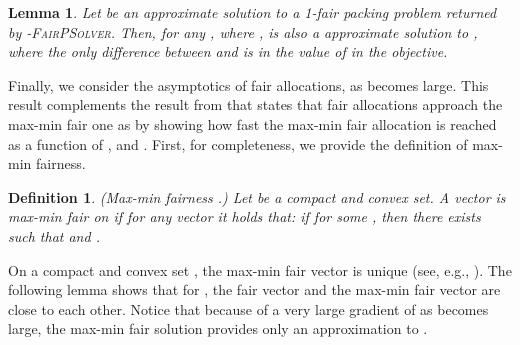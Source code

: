 \documentclass[11pt]{article}
\newtheorem{lemma}[theorem]{Lemma}
\newtheorem{definition}[theorem]{Definition}
\newif\iffullpaper
\begin{document}
\begin{lemma}\label{lemma:alpha-close-to-1-above}
Let  be an approximate solution to a 1-fair packing problem  returned by \textsc{-FairPSolver}. Then, for any , where ,  is also a approximate solution to , where the only difference between  and  is in the value of  in the objective.
\end{lemma}
\iffullpaper
\begin{proof}
Similar to the proof of Lemma \ref{lemma:alpha-close-to-1-below}, we will fix an  from some stationary round of \textsc{-FairPSolver} run on , and argue that the same  approximates  by bounding the duality gap , although we will need to use a different set of inequalities since now . Similar to the proof of Lemma \ref{lemma:alpha-close-to-1-below}, as  is (primal-)feasible for ,  and  are primal- and dual-feasible for .

By the same token as in the proof of Lemma \ref{lemma:alpha-close-to-1-below}:

As  and , , we have that , , and therefore:

Therefore, we can write for the duality gap:

Notice that, as , the objective for , , is now negative.

Using the same arguments as in the proof of Lemma \ref{lemma:alpha-close-to-1-below}, it is straightforward to show that , . From Lemma \ref{lemma:cond-lower-bound}, we have that , , and therefore:

Recalling that  (by the statement of the lemma) and using (\ref{eq:alpha-above-1-bnd-2}), we have:

Finally, plugging (\ref{eq:alpha-above-1-bnd-3}) into (\ref{eq:alpha-above-1-duality-gap}), we have:

where the equality follows from , and the last inequality follows from .
\end{proof}
\fi

Finally, we consider the asymptotics of fair allocations, as  becomes large. This result complements the result from \cite{MoWalrand2000} that states that fair allocations approach the max-min fair one as  by showing how fast the max-min fair allocation is reached as a function of , and . First, for completeness, we provide the definition of max-min fairness.
\begin{definition}(Max-min fairness \cite{Bertsekas:1987:DN:12517}.) \label{def:max-min-fairness}
Let  be a compact and convex set. A vector  is max-min fair on  if for any vector  it holds that: if for some  , then there exists  such that  and . 
\end{definition}
On a compact and convex set , the max-min fair vector is unique (see, e.g., \cite{Sarkar-Tassiulas, radunovic2007unified}). The following lemma shows that for , the fair vector and the max-min fair vector are close to each other. Notice that because of a very large gradient of  as  becomes large, the max-min fair solution provides only an approximation to . 
\end{document}
